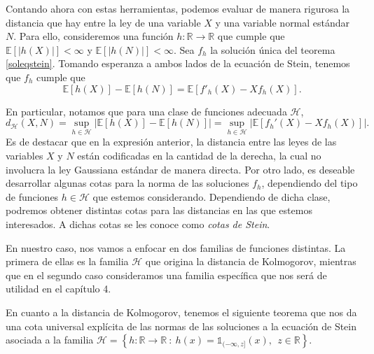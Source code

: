 \documentclass[letterpaper,twoside,12pt]{book}
\newcommand{\R}{\mathbb{R}}
\newcommand{\E}{\mathbb{E}}
\newcommand{\1}{\mathds{1}}
\newcommand{\abs}[1]{\left\lvert #1 \right\rvert}
\renewcommand{\to}{\rightarrow}
\theoremstyle{definition}
\theoremstyle{definition}
\theoremstyle{remark}
\theoremstyle{definition}
\theoremstyle{definition}
\theoremstyle{definition}
\theoremstyle{definition}
\theoremstyle{definition}
\begin{document}
 Contando ahora con estas herramientas, podemos evaluar de manera rigurosa la distancia que hay entre la ley de una variable $X$ y una variable normal estándar $N$. Para ello, consideremos una función $h:\R\to\R$ que cumple que $\E\left[\abs{h(X)}\right]<\infty$ y $\E\left[\abs{h(N)}\right]<\infty$. Sea $f_h$ la solución única del teorema \ref{soleqstein}. Tomando esperanza a ambos lados de la ecuación de Stein, tenemos que $f_h$ cumple que 
\begin{equation}\label{eqmetodostein}
   \E\left[h(X)\right]-\E\left[h(N)\right]=\E\left[f'_h(X)-Xf_h(X)\right].
 \end{equation}
 
 En particular, notamos que para una clase de funciones adecuada $\mathscr{H}$, 
  \begin{equation*}
   d_\mathscr{H}(X,N)=\sup_{h\in \mathscr{H}}\abs{\E\left[h(X)\right]-\E\left[h(N)\right]}=\sup_{h\in \mathscr{H}}\abs{\E\left[f_h'(X)-Xf_h(X)\right]}.
   \end{equation*}
 Es de destacar que en la expresión anterior, la distancia entre las leyes de las variables $X$ y $N$ están codificadas en la cantidad de la derecha, la cual no involucra la ley Gaussiana estándar de manera directa. Por otro lado, es deseable desarrollar algunas cotas para la norma de las soluciones $f_h$, dependiendo del tipo de funciones $h\in\mathscr{H}$ que estemos considerando. Dependiendo de dicha clase, podremos obtener distintas cotas para las distancias en las que estemos interesados. A dichas cotas se les conoce como \textit{cotas de Stein}.
 
 En nuestro caso, nos vamos a enfocar en dos familias de funciones distintas. La primera de ellas es la familia $\mathscr{H}$ que origina la distancia de Kolmogorov, mientras que en el segundo caso consideramos una familia específica que nos será de utilidad en el capítulo 4.
 
En cuanto a la distancia de Kolmogorov, tenemos el siguiente teorema que nos da una cota universal explícita de las normas de las soluciones a la ecuación de Stein asociada a la familia $\mathscr{H}= \left\{h:\R\to \R \ :\ h(x)=\1_{(-\infty,z]}(x),\ \  z\in \R\right\}$.
  
\end{document}
